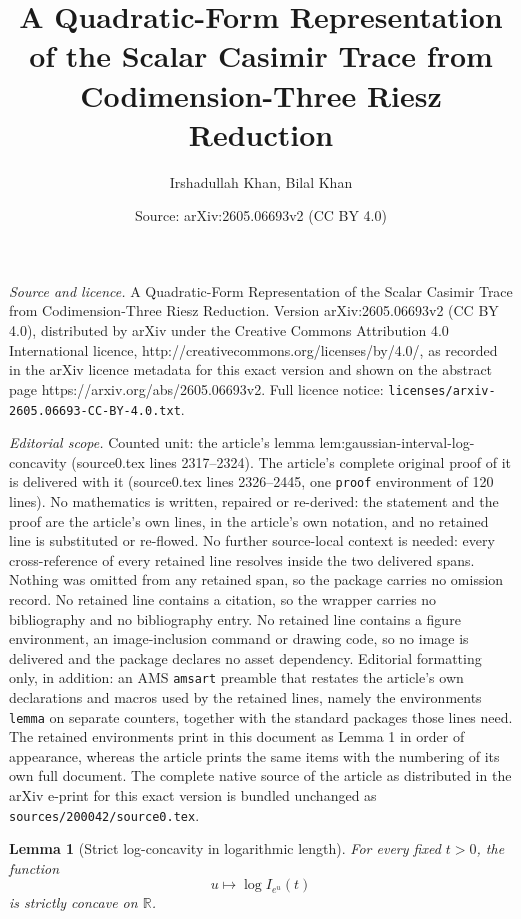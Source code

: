 \documentclass[10pt,a4paper]{amsart}
\title{A Quadratic-Form Representation of the Scalar Casimir Trace from Codimension-Three Riesz Reduction}
\author{Irshadullah Khan, Bilal Khan}
\date{Source: arXiv:2605.06693v2 (CC BY 4.0)}
\newtheorem{lemma}{Lemma}
\newcommand{\R}{\mathbb{R}}
\begin{document}
\maketitle

\noindent\emph{Source and licence.} A Quadratic-Form Representation of the Scalar Casimir Trace from Codimension-Three Riesz Reduction. Version arXiv:2605.06693v2 (CC BY 4.0), distributed by arXiv under the Creative Commons Attribution 4.0 International licence, http://creativecommons.org/licenses/by/4.0/, as recorded in the arXiv licence metadata for this exact version and shown on the abstract page https://arxiv.org/abs/2605.06693v2. Full licence notice: \texttt{licenses/arxiv-2605.06693-CC-BY-4.0.txt}.\par\smallskip

\noindent\textit{Editorial scope.} Counted unit: the article's lemma lem:gaussian-interval-log-concavity (source0.tex lines 2317--2324). The article's complete original proof of it is delivered with it (source0.tex lines 2326--2445, one \texttt{proof} environment of 120 lines). No mathematics is written, repaired or re-derived: the statement and the proof are the article's own lines, in the article's own notation, and no retained line is substituted or re-flowed.  No further source-local context is needed: every cross-reference of every retained line resolves inside the two delivered spans.  Nothing was omitted from any retained span, so the package carries no omission record.  No retained line contains a citation, so the wrapper carries no bibliography and no bibliography entry.  No retained line contains a figure environment, an image-inclusion command or drawing code, so no image is delivered and the package declares no asset dependency.  Editorial formatting only, in addition: an AMS \texttt{amsart} preamble that restates the article's own declarations and macros used by the retained lines, namely the environments \texttt{lemma} on separate counters, together with the standard packages those lines need.  The retained environments print in this document as Lemma 1 in order of appearance, whereas the article prints the same items with the numbering of its own full document.  The complete native source of the article as distributed in the arXiv e-print for this exact version is bundled unchanged as \texttt{sources/200042/source0.tex}.
\begin{lemma}[Strict log-concavity in logarithmic length]
\label{lem:gaussian-interval-log-concavity}
For every fixed \(t>0\), the function
\[
    u\longmapsto \log I_{e^u}(t)
\]
is strictly concave on \(\R\).
\end{lemma}
\end{document}
